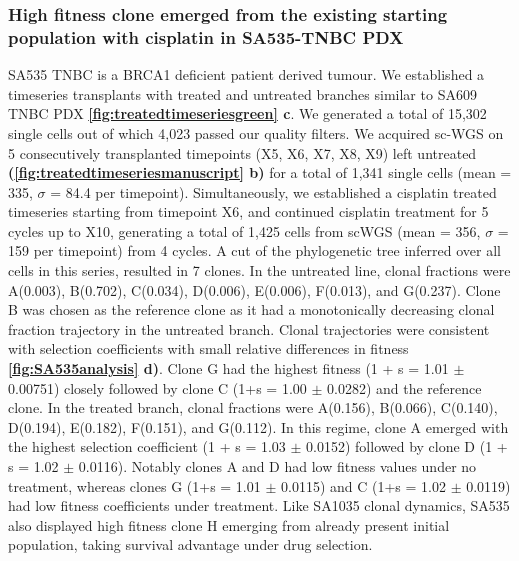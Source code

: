 \subsubsection{High fitness clone emerged from the existing starting population with cisplatin in SA535-TNBC PDX}
 SA535 TNBC is a BRCA1 deficient patient derived tumour. We established a timeseries transplants with treated and untreated branches similar to SA609 TNBC PDX \textbf{\autoref{fig:treatedtimeseriesgreen} c}.
 We generated a total of 15,302 single cells out of which 4,023 passed our quality filters.
 We acquired sc-WGS on 5 consecutively transplanted timepoints (X5, X6, X7, X8, X9) left untreated \textbf{(\autoref{fig:treatedtimeseriesmanuscript} b)} for a total of 1,341 single cells (mean = 335, $\sigma$ = 84.4 per timepoint). Simultaneously, we established a cisplatin treated timeseries starting from timepoint X6, and continued cisplatin treatment for 5 cycles up to X10, generating a total of 1,425 cells from scWGS (mean = 356, $\sigma$ = 159 per timepoint) from 4 cycles. A cut of the phylogenetic tree inferred over all cells in this series, resulted in 7 clones. In the untreated line, clonal fractions were A(0.003), B(0.702), C(0.034), D(0.006), E(0.006), F(0.013), and G(0.237).
Clone B was chosen as the reference clone as it had a monotonically decreasing clonal fraction trajectory in the untreated branch. Clonal trajectories were consistent with selection coefficients
with small relative differences in fitness \textbf{\autoref{fig:SA535analysis} d)}. Clone G had the highest fitness (1 + s = 1.01 $\pm$ 0.00751) closely followed by clone C (1+s = 1.00 $\pm$ 0.0282) and the reference clone. In the treated branch, clonal fractions were A(0.156), B(0.066), C(0.140), D(0.194), E(0.182), F(0.151), and G(0.112). In this regime, clone A emerged with the highest selection coefficient (1 + s = 1.03 $\pm$  0.0152) followed by clone D (1 + s = 1.02 $\pm$ 0.0116). Notably clones A and D had low fitness values under no treatment, whereas clones G (1+s = 1.01 $\pm$ 0.0115) and C (1+s = 1.02 $\pm$ 0.0119) had low fitness coefficients under treatment. Like SA1035 clonal dynamics, SA535 also displayed high fitness clone H emerging from already present initial population,  taking survival advantage under drug selection.



